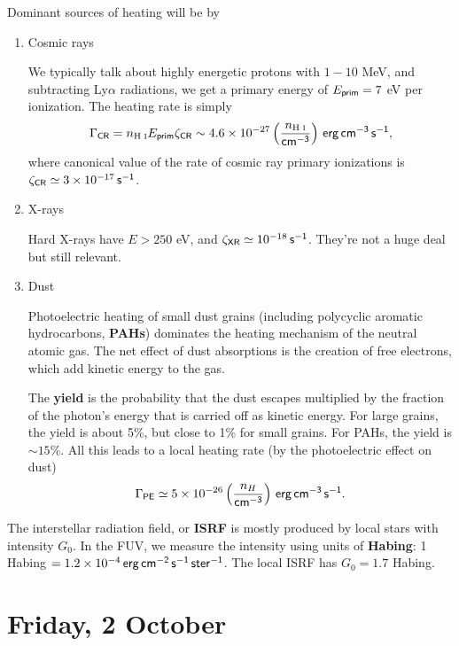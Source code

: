 \documentclass{tufte-handout}
\renewcommand{\textbf}[1]{{\bf \textcolor{dark-gray}{#1}}}
\renewcommand{\rm}{\sf}
\newcommand{\HI}{\textnormal{H{\smaller~\textsc{I}}}}
\begin{document}
Dominant sources of heating will be by
\begin{enumerate}
\item Cosmic rays

We typically talk about highly energetic protons with $1-10$ MeV, and subtracting Ly$\alpha$ radiations, we get a primary energy of $E_{\rm prim} = 7$ eV per ionization. The heating rate is simply
\begin{equation}
\Gamma_{\rm CR} = n_{\HI}E_{\rm prim} \zeta_{\rm CR} \sim 4.6 \times 10^{-27} \left (\frac{n_{\HI}}{\rm cm^{-3}}\right ) {\rm \, erg\, cm^{-3}\, s^{-1}},
\end{equation}
where canonical value of the rate of cosmic ray primary ionizations is $\zeta_{\rm CR} \simeq 3\times 10^{-17}\, {\rm s^{-1}}$.

\item X-rays

Hard X-rays have $E > 250$ eV, and $\zeta_{\rm XR} \simeq 10^{-18} {\rm\, s^{-1}}$. They're not a huge deal but still relevant.

\item Dust

Photoelectric heating of small dust grains (including polycyclic aromatic hydrocarbons, \textbf{PAHs}) dominates the heating mechanism of the neutral atomic gas. The net effect of dust absorptions is the creation of free electrons, which add kinetic energy to the gas.

The \textbf{yield} is the probability that the dust escapes multiplied by the fraction of the photon's energy that is carried off as kinetic energy. For large grains, the yield is about 5\%, but close to 1\% for small grains. For PAHs, the yield is $\sim 15\%$. All this leads to a local heating rate (by the photoelectric effect on dust)
\begin{equation}
\Gamma_{\rm PE} \simeq 5\times 10^{-26} \left (\frac{n_H}{\rm cm^{-3}}\right ) {\rm\, erg\, cm^{-3}\, s^{-1}}.
\end{equation}
\end{enumerate}

The interstellar radiation field, or \textbf{ISRF} is mostly produced by local stars with intensity $G_0$. In the FUV, we measure the intensity using units of \textbf{Habing}: 1 Habing $=1.2 \times 10^{-4} {\rm\, erg\,cm^{-2}\,s^{-1}\,ster^{-1}}$. The local ISRF has $G_0 = 1.7$ Habing.



\section{Friday, 2 October}
\end{document}
